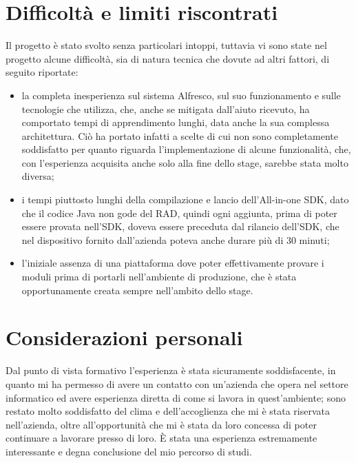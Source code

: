 \section{Difficoltà e limiti riscontrati}
Il progetto è stato svolto senza particolari intoppi, tuttavia vi sono state nel progetto alcune difficoltà, sia di natura tecnica che dovute ad altri fattori, di seguito riportate:
\begin{itemize}
\item la completa inesperienza sul sistema Alfresco, sul suo funzionamento e sulle tecnologie che utilizza, che, anche se mitigata dall'aiuto ricevuto, ha comportato tempi di apprendimento lunghi, data anche la sua complessa architettura.
Ciò ha portato infatti a scelte di cui non sono completamente soddisfatto per quanto riguarda l'implementazione di alcune funzionalità, che, con l'esperienza acquisita anche solo alla fine dello stage, sarebbe stata molto diversa;
\item i tempi piuttosto lunghi della compilazione e lancio dell'All-in-one SDK, dato che il codice Java non gode del RAD, quindi ogni aggiunta, prima di poter essere provata nell'SDK, doveva essere preceduta dal rilancio dell'SDK, che nel dispositivo fornito dall'azienda poteva anche durare più di 30 minuti;
\item l'iniziale assenza di una piattaforma dove poter effettivamente provare i moduli prima di portarli nell'ambiente di produzione, che è stata opportunamente creata sempre nell'ambito dello stage.
\end{itemize}
\section{Considerazioni personali}
Dal punto di vista formativo l'esperienza è stata sicuramente soddisfacente, in quanto mi ha permesso di avere un contatto con un'azienda che opera nel settore informatico ed avere esperienza diretta di come si lavora in quest'ambiente; sono restato molto soddisfatto del clima e dell'accoglienza che mi è stata riservata nell'azienda, oltre all'opportunità che mi è stata da loro concessa di poter continuare a lavorare presso di loro.
È stata una esperienza estremamente interessante e degna conclusione del mio percorso di studi.